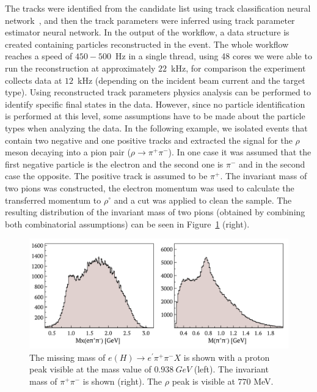 \documentclass[a4paper,11pt]{article}
\begin{document}
The tracks were identified from the candidate list using track classification neural network~\cite{Thomadakis:2022zcd}, and then the track parameters were inferred using track parameter estimator neural network. In the output of the workflow, a data structure is created containing particles reconstructed in the event. The whole workflow reaches a speed of $450-500${~\rm Hz} in a single thread, using 48 cores we were able to run the reconstruction at approximately $22${~\rm kHz}, for comparison the experiment collects data at $12${~\rm kHz} (depending on the incident beam current and the target type).
Using reconstructed track parameters physics analysis can be performed to identify specific final states in the data. However, since no particle identification is performed at this level, some assumptions have to be made about the particle types when analyzing the data. 
In the following example, we isolated events that contain two negative and one positive tracks and extracted the signal for the $\rho$ meson decaying into a pion pair ($\rho\rightarrow \pi^+ \pi^-$). In one case it was assumed that the first negative particle is the electron and the second one is $\pi^-$ and in the second case the opposite. The positive track is assumed to be $\pi^+$. The invariant mass of two pions was constructed, the electron momentum was used to calculate the transferred momentum to $\rho^\circ$ and a cut was applied to clean the sample. The resulting distribution of the invariant mass of two pions (obtained by combining both combinatorial assumptions) can be seen in Figure~\ref{fig:rho} (right). 

\begin{figure}[h!]
\centering
\includegraphics[width=0.95\columnwidth]{images/instarec_recons.pdf}
\caption{The missing mass of $e(H)\rightarrow e^\prime\pi^+\pi^-X$ is shown with a proton peak visible at the mass value of $0.938~GeV$ (left). The invariant mass of $\pi^+ \pi^-$ is shown (right). The $\rho$ peak is visible at $770$ {\rm MeV}.  }
\label{fig:rho}
\end{figure}
\end{document}
